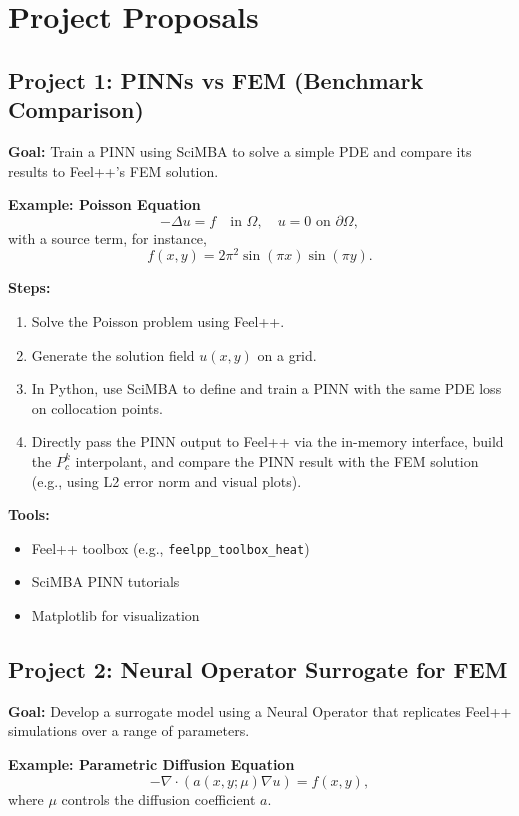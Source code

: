 \documentclass[11pt]{article}
\begin{document}
\section{Project Proposals}

\subsection{Project 1: PINNs vs FEM (Benchmark Comparison)}
\textbf{Goal:}  
Train a PINN using SciMBA to solve a simple PDE and compare its results to Feel++'s FEM solution.

\textbf{Example: Poisson Equation}
\[
-\Delta u = f \quad \text{in } \Omega, \quad u = 0 \text{ on } \partial\Omega,
\]
with a source term, for instance,
\[
f(x,y) = 2\pi^2 \sin(\pi x) \sin(\pi y).
\]

\textbf{Steps:}
\begin{enumerate}[label=\arabic*.]
    \item Solve the Poisson problem using Feel++.
    \item Generate the solution field \( u(x,y) \) on a grid.
    \item In Python, use SciMBA to define and train a PINN with the same PDE loss on collocation points.
    \item Directly pass the PINN output to Feel++ via the in-memory interface, build the \( P_c^k \) interpolant, and compare the PINN result with the FEM solution (e.g., using L2 error norm and visual plots).
\end{enumerate}

\textbf{Tools:}
\begin{itemize}
    \item Feel++ toolbox (e.g., \texttt{feelpp\_toolbox\_heat})
    \item SciMBA PINN tutorials
    \item Matplotlib for visualization
\end{itemize}

\subsection{Project 2: Neural Operator Surrogate for FEM}
\textbf{Goal:}  
Develop a surrogate model using a Neural Operator that replicates Feel++ simulations over a range of parameters.

\textbf{Example: Parametric Diffusion Equation}
\[
-\nabla \cdot (a(x,y;\mu) \nabla u) = f(x,y),
\]
where \(\mu\) controls the diffusion coefficient \(a\).
\end{document}
